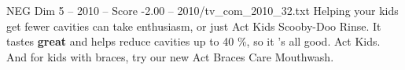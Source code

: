 \begin{textsample}{NEG Dim 5 – 2010 – Score -2.00 – 2010/tv\_com\_2010\_32.txt}  \label{ex:f5_neg_023}
Helping your kids get fewer cavities can take enthusiasm, or just Act Kids Scooby-Doo Rinse.
It tastes \textbf{great} and helps reduce cavities up to 40 \%, so it 's all good.
Act Kids.
And for kids with braces, try our new Act Braces Care Mouthwash.

\end{textsample}
